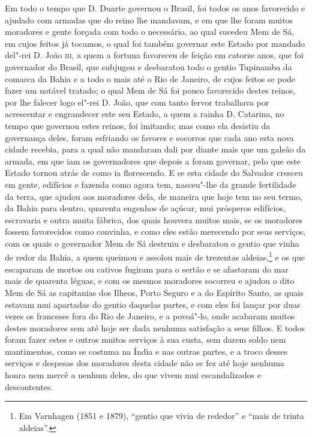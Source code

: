 \begin{linenumbers}
Em todo o tempo que D. Duarte governou o Brasil, foi todos os anos favorecido e ajudado
com armadas que do reino lhe mandavam, e em que lhe foram muitos moradores e gente forçada
com todo o necessário, ao qual sucedeu Mem de Sá, em cujos feitos já tocamos, o qual foi
também governar este Estado por mandado del"-rei D. João \textsc{iii}, a quem a fortuna
favoreceu de feição em catorze anos, que foi governador do Brasil, que subjugou e
desbaratou todo o gentio Tupinamba da comarca da Bahia e a todo o mais até o Rio de
Janeiro, de cujos feitos se pode fazer um notável tratado; o qual Mem de Sá foi pouco
favorecido destes reinos, por lhe falecer logo el"-rei D. João, que com tanto fervor
trabalhava por acrescentar e engrandecer este seu Estado, a quem a rainha D. Catarina, no
tempo que governou estes reinos, foi imitando; mas como ela desistiu da governança deles,
foram esfriando os favores e socorros que cada ano esta nova cidade recebia, para a qual
não mandaram dali por diante mais que um galeão da armada, em que iam os governadores que
depois a foram governar, pelo que este Estado tornou atrás de como ia florescendo. E se
esta cidade do Salvador cresceu em gente, edifícios e fazenda como agora tem, nasceu"-lhe
da grande fertilidade da terra, que ajudou aos moradores dela, de maneira que hoje tem no
seu termo, da Bahia para dentro, quarenta engenhos de açúcar, mui prósperos edifícios,
escravaria e outra muita fábrica, dos quais houvera muitos mais, se os moradores fossem
favorecidos como convinha, e como eles estão merecendo por seus serviços, com os quais o
governador Mem de Sá destruiu e desbaratou o gentio que vinha de redor da Bahia, a quem
queimou e assolou mais de trezentas aldeias,\footnote{ Em Varnhagen (1851 e 1879),
``gentio que vivia de rededor'' e ``mais de trinta aldeias''.} e os que escaparam de
mortos ou cativos fugiram para o sertão e se afastaram do mar mais de quarenta léguas, e
com os mesmos moradores socorreu e ajudou o dito Mem de Sá as capitanias dos Ilheos, Porto
Seguro e a do Espírito Santo, as quais estavam mui apartadas do gentio daquelas partes, e
com eles foi lançar por duas vezes os franceses fora do Rio de Janeiro, e a povoá"-lo, onde
acabaram muitos destes moradores sem até hoje ser dada nenhuma satisfação a seus filhos. E
todos foram fazer estes e outros muitos serviços à sua custa, sem darem soldo nem
mantimentos, como se costuma na Índia e nas outras partes, e a troco desses serviços e
despesas dos moradores desta cidade não se fez até hoje nenhuma honra nem mercê a nenhum
deles, do que vivem mui escandalizados e descontentes.


\end{linenumbers}
